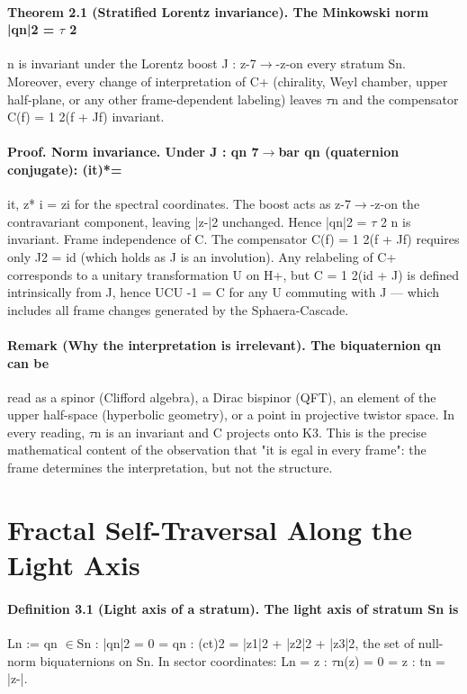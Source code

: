 \paragraph*{Theorem 2.1 (Stratified Lorentz invariance). The Minkowski norm |qn|2 = $\tau$ 2}
n is invariant under the Lorentz boost J : z-7$\to$-z-on every stratum Sn. Moreover, every change of interpretation of C+ (chirality, Weyl chamber, upper half-plane, or any other frame-dependent labeling) leaves $\tau$n and the compensator C(f) = 1 2(f + Jf) invariant.
\paragraph*{Proof. Norm invariance. Under J : qn 7$\to$bar qn (quaternion conjugate): (it)*=}
it, z* i = zi for the spectral coordinates. The boost acts as z-7$\to$-z-on the contravariant component, leaving |z-|2 unchanged. Hence |qn|2 = $\tau$ 2 n is invariant. Frame independence of C. The compensator C(f) = 1 2(f + Jf) requires only J2 = id (which holds as J is an involution). Any relabeling of C+ corresponds to a unitary transformation U on H+, but C = 1 2(id + J) is defined intrinsically from J, hence UCU -1 = C for any U commuting with J --- which includes all frame changes generated by the Sphaera-Cascade.
\paragraph*{Remark (Why the interpretation is irrelevant). The biquaternion qn can be}
read as a spinor (Clifford algebra), a Dirac bispinor (QFT), an element of the upper half-space (hyperbolic geometry), or a point in projective twistor space. In every reading, $\tau$n is an invariant and C projects onto K3. This is the precise mathematical content of the observation that "it is egal in every frame": the frame determines the interpretation, but not the structure.

\section{Fractal Self-Traversal Along the Light Axis}
\paragraph*{Definition 3.1 (Light axis of a stratum). The light axis of stratum Sn is}
Ln := {qn $\in$Sn : |qn|2 = 0} = {qn : (ct)2 = |z1|2 + |z2|2 + |z3|2}, the set of null-norm biquaternions on Sn. In sector coordinates: Ln = {z : $\tau$n(z) = 0} = {z : tn = |z-|}.
